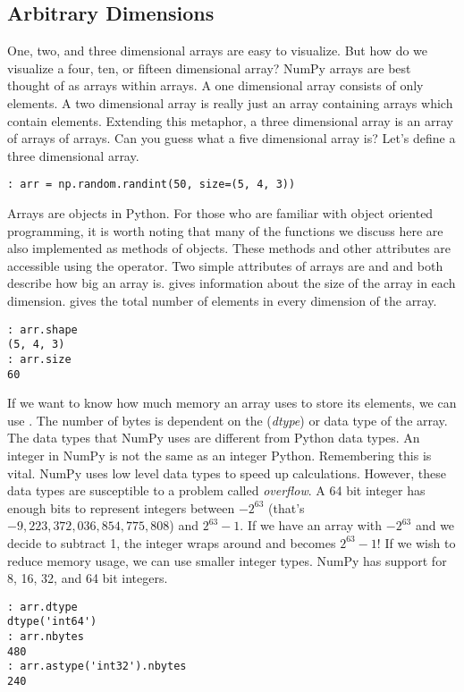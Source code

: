 \subsection*{Arbitrary Dimensions}
One, two, and three dimensional arrays are easy to visualize.
But how do we visualize a four, ten, or fifteen dimensional array?
NumPy arrays are best thought of as arrays within arrays.
A one dimensional array consists of only elements.
A two dimensional array is really just an array containing arrays which contain elements.
Extending this metaphor, a three dimensional array is an array of arrays of arrays.
Can you guess what a five dimensional array is?
Let's define a three dimensional array.

\begin{lstlisting}
: arr = np.random.randint(50, size=(5, 4, 3))
\end{lstlisting}

Arrays are objects in Python.
For those who are familiar with object oriented programming, it is worth noting that many of the functions we discuss here are also implemented as methods of  objects.
These methods and other attributes are accessible using the  operator.
Two simple attributes of arrays are  and 
 and  both describe how big an array is.
 gives information about the size of the array in each dimension.
 gives the total number of elements in every dimension of the array.
\begin{lstlisting}
: arr.shape
(5, 4, 3)
: arr.size
60
\end{lstlisting}

If we want to know how much memory an array uses to store its elements, we can use .
The number of bytes is dependent on the (\emph{dtype}) or data type of the array.
The data types that NumPy uses are different from Python data types.
An integer in NumPy is not the same as an integer Python.
Remembering this is vital.
NumPy uses low level data types to speed up calculations.
However, these data types are susceptible to a problem called \emph{overflow}.
A 64 bit integer has enough bits to represent integers between $-2^{63}$ (that's $-9,223,372,036,854,775,808$) and $2^{63} - 1$.
If we have an array with $-2^{63}$ and we decide to subtract 1, the integer wraps around and becomes $2^{63} - 1$!  If we wish to reduce memory usage, we can use smaller integer types.
NumPy has support for 8, 16, 32, and 64 bit integers. 
\begin{lstlisting}
: arr.dtype
dtype('int64')
: arr.nbytes
480
: arr.astype('int32').nbytes
240
\end{lstlisting}

